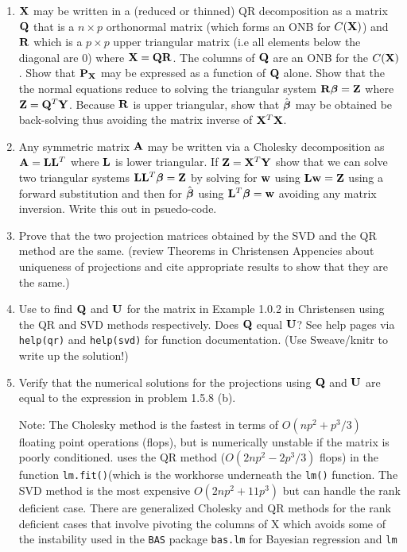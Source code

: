 \documentclass{article}\usepackage[]{graphicx}\usepackage[]{color}
\begin{document}
\begin{enumerate}
\begin{enumerate}
    \item  $\mathbf{X}$ may be written in a (reduced or thinned) QR decomposition as a matrix
  $\mathbf{Q}$ that is a $n \times p$ orthonormal matrix (which forms an ONB
  for $C(\mathbf{X})$) and $\mathbf{R}$ which is a $p
  \times p$ upper triangular matrix (i.e all elements below the
  diagonal are 0) where $\mathbf{X} = \mathbf{Q} \mathbf{R}$. The columns of $\mathbf{Q}$ are an ONB for
  the $C(\mathbf{X})$. Show that $\mathbf{P}_{\mathbf{X}}$
  may be expressed as a function of $\mathbf{Q}$ alone.   Show that  the
 the normal equations reduce to solving the triangular system $\mathbf{R} \boldsymbol{\beta} = \mathbf{Z}$ where $\mathbf{Z} = \mathbf{Q}^T \mathbf{Y}$.
 Because $\mathbf{R}$ is upper triangular, show that $\hat{\boldsymbol{\beta}}$ may be
 obtained be back-solving thus avoiding the matrix inverse of $\mathbf{X}^T\mathbf{X}$.
\gap

 \item Any symmetric matrix $\mathbf{A}$ may be written via a Cholesky
  decomposition as $\mathbf{A} = \mathbf{L} \mathbf{L}^T$ where $\mathbf{L}$
  is lower triangular.   If $\mathbf{Z} = \mathbf{X}^T\mathbf{Y}$  show that we can solve two
  triangular systems $\mathbf{L} \mathbf{L}^T \boldsymbol{\beta} = \mathbf{Z}$ by solving for $\mathbf{w}$ using  $\mathbf{L} \mathbf{w} = \mathbf{Z}$ using a
  forward substitution and then for $\hat{\boldsymbol{\beta}}$ using
  $\mathbf{L}^T \boldsymbol{\beta} = \mathbf{w}$ avoiding any matrix inversion.  Write this out in psuedo-code.
\gap

 \item Prove that the two projection matrices obtained by the SVD and  the QR method are the same.  (review Theorems in Christensen Appencies about uniqueness of projections and cite appropriate results to show that they are the same.)
\gap

\item Use \R to find $\mathbf{Q}$ and $\mathbf{U}$ for the matrix in Example 1.0.2 in Christensen using the QR and SVD methods respectively. Does $\mathbf{Q}$ equal $\mathbf{U}$?   See help pages via {\tt help(qr)} and  {\tt help(svd)} for function documentation.
     (Use Sweave/knitr to  write up the solution!)



\gap
\item Verify that the numerical solutions for the projections using $\mathbf{Q}$ and $\mathbf{U}$ are equal to the expression in problem 1.5.8 (b).

    Note: The Cholesky method is the fastest in terms of $O(n p^2 + p^3 /3)$  floating point operations (flops), but is numerically unstable if the matrix is poorly conditioned.  \R   uses the QR method ($O(2 n p^2 - 2p^3 /3)$ flops) in the function  {\tt lm.fit()}(which is the workhorse underneath the {\tt lm()} function.   The SVD method is the most expensive $O(2 n p^2 + 11 p^3)$ but can handle the rank deficient case. There are generalized Cholesky and QR methods for the rank deficient cases that involve pivoting the columns of X which avoids some of the instability used in the {\tt BAS} package {\tt bas.lm} for Bayesian regression and {\tt lm}


\end{enumerate}
\end{enumerate}
\end{document}
